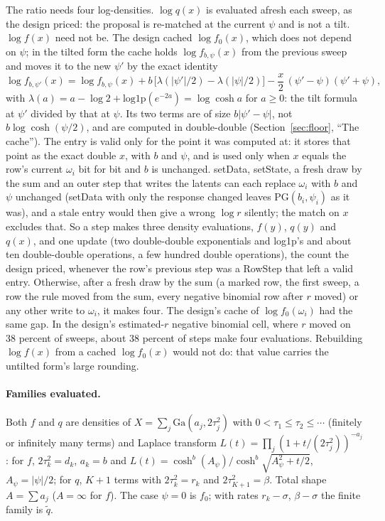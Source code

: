 \documentclass[11pt]{article}
\theoremstyle{definition}
\newcommand{\PG}{\mathrm{PG}}
\newcommand{\Ga}{\mathrm{Ga}}
\newcommand{\qt}{\widetilde q}
\newcommand{\fz}{f_0}
\begin{document}
The ratio needs four log-densities. $\log q(x)$ is evaluated afresh each sweep, as the design priced: the
proposal is re-matched at the current $\psi$ and is not a tilt. $\log f(x)$ need not be. The design cached
$\log\fz(x)$, which does not depend on $\psi$; in the tilted form the cache holds $\log f_{b,\psi}(x)$ from the
previous sweep and moves it to the new $\psi'$ by the exact identity
\begin{equation}\label{eq:tiltupd}
  \log f_{b,\psi'}(x)=\log f_{b,\psi}(x)+b\,\bigl[\lambda(|\psi'|/2)-\lambda(|\psi|/2)\bigr]
  -\frac x2\,(\psi'-\psi)(\psi'+\psi),
\end{equation}
with $\lambda(a)=a-\log2+\mathrm{log1p}(e^{-2a})=\log\cosh a$ for $a\ge0$: the tilt formula at $\psi'$ divided by
that at $\psi$. Its two terms are
of size $b|\psi'-\psi|$, not $b\log\cosh(\psi/2)$, and are computed in double-double (Section~\ref{sec:floor},
``The cache''). The entry is valid only for the point it was computed at: it stores that point as the exact double
$x$, with $b$ and $\psi$, and is used only when $x$ equals the row's current $\omega_i$ bit for bit and $b$ is
unchanged. setData, setState, a fresh draw by the sum and an outer step that writes the latents can each replace
$\omega_i$ with $b$ and $\psi$ unchanged (setData with only the response changed leaves $\PG(b_i,\psi_i)$ as it
was), and a stale entry would then give a wrong $\log r$ silently; the match on $x$ excludes that. So a step makes
three density evaluations, $f(y)$, $q(y)$ and $q(x)$, and one update (two double-double exponentials and
log1p's and about ten double-double operations, a few hundred double operations), the count the design priced, whenever the row's previous step
was a RowStep that left a valid entry. Otherwise, after a fresh draw by the sum (a marked row, the first sweep, a
row the rule moved from the sum, every negative binomial row after $r$ moved) or any other write to $\omega_i$, it
makes four. The design's cache of $\log\fz(\omega_i)$ had the same gap. In the design's estimated-$r$ negative
binomial cell, where $r$ moved on 38 percent of sweeps, about 38 percent of steps make four evaluations.
Rebuilding $\log f(x)$ from a cached $\log\fz(x)$ would not do: that value carries the untilted form's large
rounding.

\paragraph{Families evaluated.} Both $f$ and $q$ are densities of $X=\sum_j\Ga(a_j,2\tau_j^2)$ with
$0<\tau_1\le\tau_2\le\cdots$ (finitely or infinitely many terms) and Laplace transform
$L(t)=\prod_j(1+t/(2\tau_j^2))^{-a_j}$: for $f$, $2\tau_k^2=d_k$, $a_k=b$ and
$L(t)=\cosh^b(A_\psi)/\cosh^b\sqrt{A_\psi^2+t/2}$, $A_\psi=|\psi|/2$; for $q$, $K+1$ terms with $2\tau_k^2=r_k$ and
$2\tau_{K+1}^2=\beta$. Total shape $A=\sum a_j$ ($A=\infty$ for $f$). The case $\psi=0$ is $\fz$; with rates
$r_k-\sigma$, $\beta-\sigma$ the finite family is $\qt$.
\end{document}
